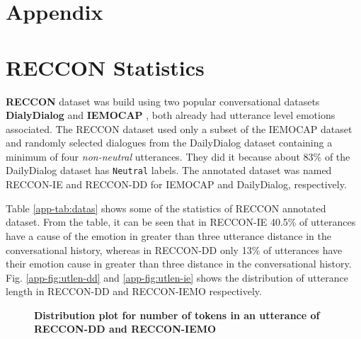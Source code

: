 \documentclass{article}
\begin{document}




\clearpage
\newpage
\appendix
\section*{Appendix}

\section{RECCON Statistics}\label{app:reccon}

\textbf{RECCON} dataset was build using two popular conversational datasets \textbf{DialyDialog} \cite{li-etal-2017-dailydialog} and \textbf{IEMOCAP} \cite{busso2008iemocap}, both already had utterance level emotions associated. The RECCON dataset used only a subset of the IEMOCAP dataset and randomly selected dialogues from the DailyDialog dataset containing a minimum of four \textit{non-neutral} utterances. They did it because about 83\% of the DailyDialog dataset has \texttt{Neutral} labels. The annotated dataset was named RECCON-IE and RECCON-DD for IEMOCAP and DailyDialog, respectively.




Table \ref{app-tab:datas} shows some of the statistics of RECCON annotated dataset. From the table, it can be seen that in RECCON-IE 40.5\% of utterances have a cause of the emotion in greater than three utterance distance in the conversational history, whereas in RECCON-DD only 13\% of utterances have their emotion cause in greater than three distance in the conversational history.  Fig. \ref{app-fig:utlen-dd} and \ref{app-fig:utlen-ie} shows the distribution of utterance length in RECCON-DD and RECCON-IEMO respectively.

\begin{figure*}[h]\centering
{}\qquad
{}\caption{\textbf{Distribution plot for number of tokens in an utterance of RECCON-DD and RECCON-IEMO}}
\end{figure*}
\end{document}
